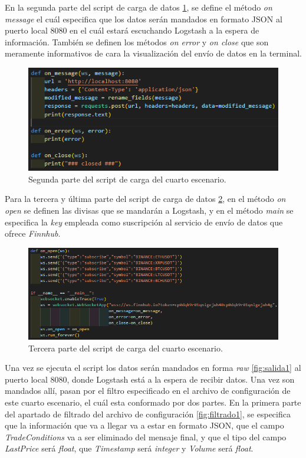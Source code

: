 En la segunda parte del script de carga de datos \ref{fig:escenario42}, se define el método \textit{on message} el cuál especifica que los datos serán mandados en formato JSON al puerto local 8080 en el cuál estará escuchando Logstash a la espera de información. También se definen los métodos \textit{on error} y \textit{on close} que son meramente informativos de cara la visualización del envío de datos en la terminal.
\begin{figure}
    \centering
    \includegraphics[width=1\linewidth]{img/websocket2.png}
    \caption{Segunda parte del script de carga del cuarto escenario.}
    \label{fig:escenario42}
\end{figure}

Para la tercera y última parte del script de carga de datos \ref{fig:escenario43}, en el método \textit{on open} se definen las divisas que se mandarán a Logstash, y en el método \textit{main} se especifica la \textit{key} empleada como suscripción al servicio de envío de datos que ofrece \textit{Finnhub}.

\begin{figure}
    \centering
    \includegraphics[width=1\linewidth]{img/websocket3.png}
    \caption{Tercera parte del script de carga del cuarto escenario.}
    \label{fig:escenario43}
\end{figure}
Una vez se ejecuta el script los datos serán mandados en forma \textit{raw} \ref{fig:salida1} al puerto local 8080, donde Logstash está a la espera de recibir datos. Una vez son mandados allí, pasan por el filtro especificado en el archivo de configuración de este cuarto escenario, el cuál esta conformado por dos partes. En la primera parte del apartado de filtrado del archivo de configuración \ref{fig:filtrado1}, se especifica que la información que va a llegar va a estar en formato JSON, que el campo \textit{TradeConditions} va a ser eliminado del mensaje final, y que el tipo del campo \textit{LastPrice} será \textit{float}, que \textit{Timestamp} será \textit{integer} y \textit{Volume} será \textit{float}.

